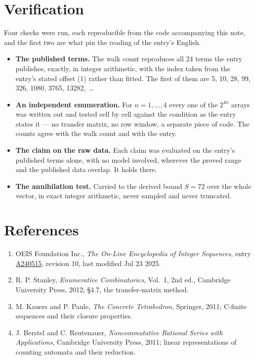\documentclass[11pt]{article}
\theoremstyle{definition}
\begin{document}
\section{Verification}

Four checks were run, each reproducible from the code accompanying this note, and the first two are what pin the reading of the entry's English.

\begin{itemize}

\item {\bfseries The published terms.} The walk count reproduces all 24 terms the entry publishes, exactly, in integer arithmetic, with the index taken from the entry's stated offset (1) rather than fitted. The first of them are 5, 10, 28, 99, 326, 1080, 3765, 13282,~\dots

\item {\bfseries An independent enumeration.} For $n = 1,\dots,4$ every one of the $2^{4n}$ arrays was written out and tested cell by cell against the condition as the entry states it --- no transfer matrix, no row window, a separate piece of code. The counts agree with the walk count and with the entry.

\item {\bfseries The claim on the raw data.} Each claim was evaluated on the entry's published terms alone, with no model involved, wherever the proved range and the published data overlap. It holds there.

\item {\bfseries The annihilation test.} Carried to the derived bound $S = 72$ over the whole vector, in exact integer arithmetic, never sampled and never truncated.

\end{itemize}

\section{References}

\begin{enumerate}

\item OEIS Foundation Inc., \emph{The On-Line Encyclopedia of Integer Sequences}, entry \href{https://oeis.org/A240515}{A240515}, revision 10, last modified Jul 23 2025.

\item R. P. Stanley, \emph{Enumerative Combinatorics}, Vol.~1, 2nd ed., Cambridge University Press, 2012; \S4.7, the transfer-matrix method.

\item M. Kauers and P. Paule, \emph{The Concrete Tetrahedron}, Springer, 2011; C-finite sequences and their closure properties.

\item J. Berstel and C. Reutenauer, \emph{Noncommutative Rational Series with Applications}, Cambridge University Press, 2011; linear representations of counting automata and their reduction.

\end{enumerate}
\end{document}
